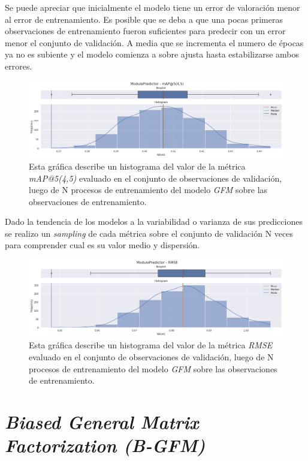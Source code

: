 \documentclass[11pt,a4paper,twoside]{thesis}
\begin{document}
Se puede apreciar que inicialmente el modelo tiene un error de valoración menor
al error de entrenamiento. Es posible que se deba a que una pocas primeras
observaciones de entrenamiento fueron suficientes para predecir con un error
menor el conjunto de validación. A media que se incrementa el numero de épocas
ya no es subiente y el modelo comienza a sobre ajusta hasta estabilizarse ambos
errores.

\clearpage

\begin{figure}[h!]
	\centering
	\includegraphics[width=15cm]{./images/metrics-GFM-mapk.png}
	\caption{Esta gráfica describe un histograma del valor de la
		métrica \textit{mAP@5(4,5)} evaluado en el conjunto de observaciones
		de validación, luego de N procesos de entrenamiento del modelo
		\textit{GFM} sobre las observaciones de entrenamiento.}
\end{figure}

Dado la tendencia de los modelos a la variabilidad o varianza de sus
predicciones se realizo un \textit{sampling} de cada métrica sobre el conjunto
de validación N veces para comprender cual es su valor medio y dispersión.

\begin{figure}[h!]
	\centering
	\includegraphics[width=15cm]{./images/metrics-GFM-RMSE.png}
	\caption{Esta gráfica describe un histograma del valor de la métrica
		\textit{RMSE} evaluado en el conjunto de observaciones de validación,
		luego de N procesos de entrenamiento del modelo \textit{GFM} sobre
		las observaciones de entrenamiento.}
\end{figure}

\clearpage
\section{\textit{Biased General Matrix Factorization (B-GFM)}}
\end{document}
